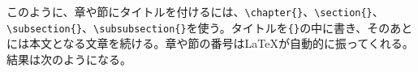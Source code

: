 このように、章や節にタイトルを付けるには、\verb|\chapter{}|、\verb|\section{}|、\verb|\subsection{}|、\verb|\subsubsection{}|を使う。タイトルを\verb|{}|の中に書き、そのあとには本文となる文章を続ける。章や節の番号は\LaTeX が自動的に振ってくれる。
結果は次のようになる。
